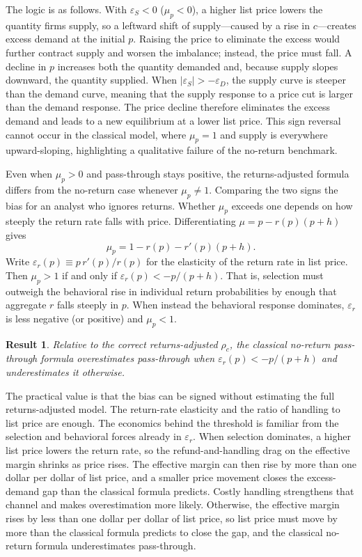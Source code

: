 \documentclass[11pt]{article}
\newtheorem{result}{Result}
\begin{document}
The logic is as follows.  With $\varepsilon_S<0$ ($\mu_p<0$), a higher list price lowers the
quantity firms supply, so a leftward shift of supply---caused by a rise in
$c$---creates excess demand at the initial $p$.  Raising the price to eliminate
the excess would further contract supply and worsen the imbalance; instead,
the price must fall.  A decline in $p$ increases both the quantity demanded
and, because supply slopes downward, the quantity supplied.  When
$|\varepsilon_S|>-\varepsilon_D$, the supply curve is steeper than the demand
curve, meaning that the supply response to a price cut is larger than the
demand response.  The price decline therefore eliminates the excess demand and
leads to a new equilibrium at a lower list price.  This sign reversal cannot
occur in the classical model, where $\mu_p=1$ and supply is everywhere
upward-sloping, highlighting
a qualitative failure of the no-return benchmark.

Even when $\mu_p>0$ and pass-through stays positive, the returns-adjusted
formula differs from the no-return case whenever $\mu_p\neq 1$.  Comparing the
two signs the bias for an analyst who ignores returns.
Whether $\mu_p$ exceeds one depends on how steeply the return rate falls with
price.  Differentiating $\mu=p-r(p)(p+h)$ gives
\[
\mu_p=1-r(p)-r'(p)(p+h).
\]
Write $\varepsilon_r(p)\equiv p\,r'(p)/r(p)$ for the elasticity of the return rate
in list price.  Then $\mu_p>1$ if and only if $\varepsilon_r(p)<-p/(p+h)$.
That is, selection must outweigh the behavioral rise in individual return
probabilities by enough that aggregate $r$ falls steeply in $p$.  When instead
the behavioral response dominates, $\varepsilon_r$ is less negative (or
positive) and $\mu_p<1$.
\begin{result}
\label{res:pt-bias-er}
  Relative to the correct returns-adjusted $\rho_c$, the classical no-return
  pass-through formula overestimates pass-through when
  $\varepsilon_r(p)<-p/(p+h)$ and underestimates it otherwise.
\end{result}
The practical value is that the bias can be signed without estimating the full
returns-adjusted model.  The return-rate elasticity and the ratio of handling
to list price are enough.  The economics behind the threshold is familiar from
the selection and behavioral forces already in $\varepsilon_r$.  When selection
dominates, a higher list price lowers the return rate, so the
refund-and-handling drag on the effective margin shrinks as price rises.
The effective margin can then rise by more than one dollar per dollar of
list price, and a smaller price movement closes the excess-demand gap than
the classical formula predicts.  Costly handling strengthens that channel and
makes overestimation more likely.  Otherwise, the effective margin rises by
less than one dollar per dollar of list price, so list price must move by more
than the classical formula predicts to close the gap, and the classical
no-return formula underestimates pass-through.
\end{document}
